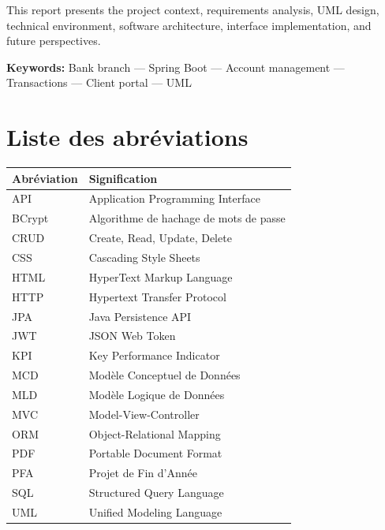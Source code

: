 \documentclass[11pt,a4paper,oneside]{report}
\begin{document}
This report presents the project context, requirements analysis, UML design, technical environment, software architecture, interface implementation, and future perspectives.

\vspace{0.5cm}
\textbf{Keywords:} Bank branch — Spring Boot — Account management — Transactions — Client portal — UML

\clearpage
\tableofcontents
\clearpage
\listoffigures
\clearpage
\listoftables

\chapter*{Liste des abréviations}

\begin{tabular}{@{}ll@{}}
    \rowcolors{2}{AmanaBeige!40}{white}
    \rowcolor{AmanaBrown}
    \color{white}\textbf{Abréviation} & \textbf{Signification} \\
    \midrule
    API     & Application Programming Interface \\
    BCrypt  & Algorithme de hachage de mots de passe \\
    CRUD    & Create, Read, Update, Delete \\
    CSS     & Cascading Style Sheets \\
    HTML    & HyperText Markup Language \\
    HTTP    & Hypertext Transfer Protocol \\
    JPA     & Java Persistence API \\
    JWT     & JSON Web Token \\
    KPI     & Key Performance Indicator \\
    MCD     & Modèle Conceptuel de Données \\
    MLD     & Modèle Logique de Données \\
    MVC     & Model-View-Controller \\
    ORM     & Object-Relational Mapping \\
    PDF     & Portable Document Format \\
    PFA     & Projet de Fin d'Année \\
    SQL     & Structured Query Language \\
    UML     & Unified Modeling Language \\
    \bottomrule
\end{tabular}

\setcounter{page}{0}
\end{document}
